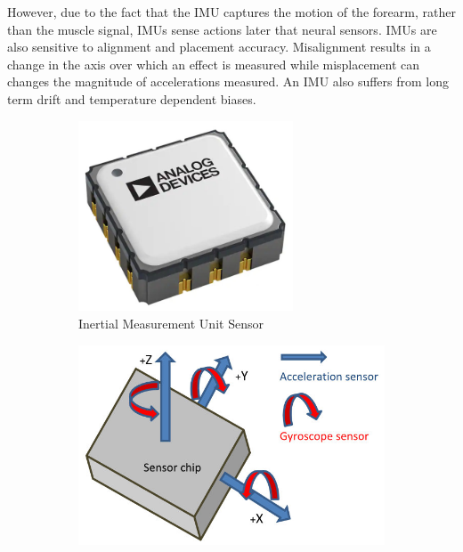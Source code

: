 However, due to the fact that the IMU captures the motion of the forearm, rather than the muscle signal, IMUs sense actions later that neural sensors\cite{Bangaru2020, Godiyal2018a}. IMUs are also sensitive to alignment and placement accuracy. Misalignment results in a change in the axis over which an effect is measured while misplacement can changes the magnitude of accelerations measured\cite{Minor1998}. An IMU also suffers from long term drift and temperature dependent biases\cite{Geiger2008, Minor1998, Wittmann2019}.

\begin{figure}[!hbtp]
    \centering
    \begin{subfigure}[b]{0.45\textwidth}
        \centering
        \includegraphics[width=0.7\textwidth]{content/2-Background/sensors/imu_sensor.jpg}
        \caption{Inertial Measurement Unit Sensor\cite{AnalogIMU}}
    \end{subfigure}
    \begin{subfigure}[b]{0.45\textwidth}
        \centering
        \includegraphics[width=\textwidth]{content/2-Background/sensors/imu_axis.jpg}

\end{subfigure}
\end{figure}
